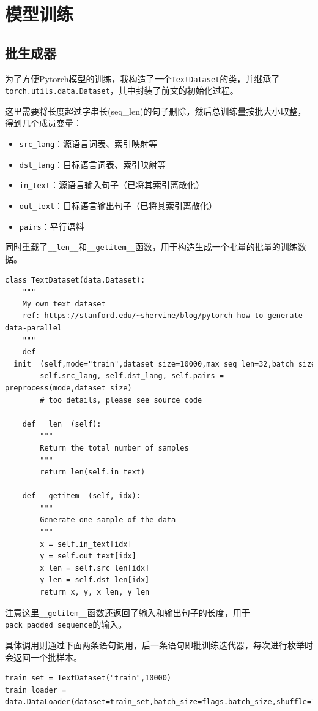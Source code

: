 \documentclass[logo,reportComp]{thesis}
\begin{document}
\section{模型训练}
\subsection{批生成器}
\label{sub:batch_generator}
为了方便Pytorch模型的训练，我构造了一个\verb'TextDataset'的类，并继承了\verb'torch.utils.data.Dataset'，其中封装了前文的初始化过程。

这里需要将长度超过字串长(seq\_len)的句子删除，然后总训练量按批大小取整，得到几个成员变量：
\begin{itemize}
    \item \verb'src_lang'：源语言词表、索引映射等
    \item \verb'dst_lang'：目标语言词表、索引映射等
    \item \verb'in_text'：源语言输入句子（已将其索引离散化）
    \item \verb'out_text'：目标语言输出句子（已将其索引离散化）
    \item \verb'pairs'：平行语料
\end{itemize}

同时重载了\verb'__len__'和\verb'__getitem__'函数，用于构造生成一个批量的批量的训练数据。
\begin{lstlisting}
class TextDataset(data.Dataset):
    """
    My own text dataset
    ref: https://stanford.edu/~shervine/blog/pytorch-how-to-generate-data-parallel
    """
    def __init__(self,mode="train",dataset_size=10000,max_seq_len=32,batch_size=32,trunc=-1):
        self.src_lang, self.dst_lang, self.pairs = preprocess(mode,dataset_size)
        # too details, please see source code

    def __len__(self):
        """
        Return the total number of samples
        """
        return len(self.in_text)

    def __getitem__(self, idx):
        """
        Generate one sample of the data
        """
        x = self.in_text[idx]
        y = self.out_text[idx]
        x_len = self.src_len[idx]
        y_len = self.dst_len[idx]
        return x, y, x_len, y_len
\end{lstlisting}

注意这里\verb'__getitem__'函数还返回了输入和输出句子的长度，用于\verb'pack_padded_sequence'的输入。

具体调用则通过下面两条语句调用，后一条语句即批训练迭代器，每次进行枚举时会返回一个批样本。
\begin{lstlisting}
train_set = TextDataset("train",10000)
train_loader = data.DataLoader(dataset=train_set,batch_size=flags.batch_size,shuffle=True)
\end{lstlisting}
\end{document}
